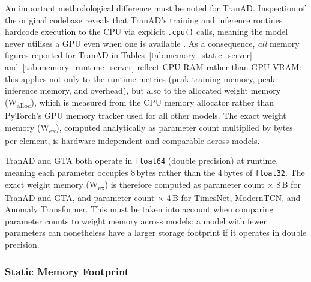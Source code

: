 \documentclass[twoside,11pt,openright]{report}
\begin{document}
An important methodological difference must be noted 
for TranAD. Inspection of the original codebase reveals that TranAD's training and inference 
routines hardcode execution to the CPU via explicit \texttt{.cpu()} calls, meaning the model 
never utilises a GPU even when one is available \citep{tranad2022}. As a consequence, 
\textit{all} memory figures reported for 
TranAD in Tables~\ref{tab:memory_static_server} and~\ref{tab:memory_runtime_server} reflect 
CPU RAM rather than GPU VRAM: this applies not only to the runtime metrics (peak training 
memory, peak inference memory, and overhead), but also to the allocated weight memory 
(W\textsubscript{alloc}), which is measured from the CPU memory allocator rather than 
PyTorch's GPU memory tracker used for all other models. The exact weight memory 
(W\textsubscript{ex}), computed analytically as parameter count multiplied by bytes per 
element, is hardware-independent and comparable across models.

TranAD and GTA both operate 
in \texttt{float64} (double precision) at runtime, meaning each parameter occupies 
8\,bytes rather than the 4\,bytes of \texttt{float32}. The exact weight memory 
(W\textsubscript{ex}) is therefore computed as parameter count $\times$ 8\,B for TranAD 
and GTA, and parameter count $\times$ 4\,B for TimesNet, ModernTCN, and Anomaly Transformer. 
This must be taken into account when comparing parameter counts to weight memory across 
models: a model with fewer parameters can nonetheless have a larger storage footprint if it 
operates in double precision.

\subsubsection{Static Memory Footprint}
\label{subsubsec:static_memory}
\end{document}
